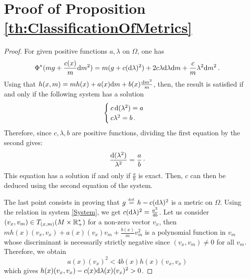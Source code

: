 \section{Proof of Proposition \ref{th:ClassificationOfMetrics}}\label{sec:ProofOfClassificationOfMetrics}
\begin{proof}
For given positive functions $a, \lambda$ on $\Omega$, one has
\begin{equation}
\Phi^*(mg +  \frac{c(x)}{ m} \mathrm{d} m^2) = m (g + c (\mathrm{d} \lambda)^2) + 2c \lambda \mathrm{d} \lambda  \mathrm{d} m + \frac{c}{m} \lambda^2 \mathrm{d} m^2\,.
\end{equation}
Using that
$h(x,m) = m h(x) + a(x) \mathrm{d} m + b(x) \frac{\mathrm{d} m^2}{m}$,
then, the result is satisfied if and only if the following system  has a solution
\begin{equation}\label{System}
\begin{cases}
c  \,\mathrm{d} (\lambda^2)= a \\
c \lambda^2 =  b \,.
\end{cases}
\end{equation} 
Therefore, since $c, \lambda,b$ are positive functions, dividing the first equation by the second gives:
$$ \frac{\mathrm{d} (\lambda^2)}{\lambda^2} = \frac{a}{b}\,\cdot$$ 
This equation has a solution if and only if  $\frac{a}{b}$ is exact. Then, $c$ can then be deduced using the second equation of the system.

The last point consists in proving that $g \stackrel{\mbox{\upshape\tiny def.}}{=} h - c (\mathrm{d} \lambda)^2 $ is a metric on $\Omega$. Using the relation in system \eqref{System}, we get 
$c  (\mathrm{d} \lambda)^2 = \frac{a^2}{4b}$. Let us consider $(v_x,v_m) \in T_{(x,m)}(M \times \mathbb{R}_+^*)$ for a non-zero vector $v_x$, then $mh(x)(v_x,v_x) + a(x)(v_x)v_m + \frac{b(x)}{m}v_m^2$ is a polynomial function in $v_m$ whose discriminant is necessarily strictly negative since $(v_x,v_m) \neq 0$ for all $v_m$. Therefore, we obtain 
\begin{equation}
a(x)(v_x)^2 < 4 b(x)h(x)(v_x,v_x)
\end{equation}
which gives $h(x)(v_x,v_x) - c(x) \mathrm{d} \lambda(x)(v_x)^2 > 0$.
\end{proof}



